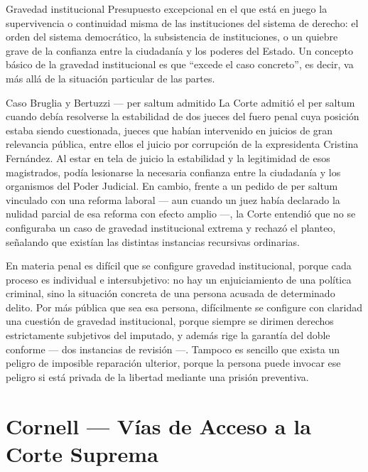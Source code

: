 \documentclass[12pt,oneside]{book}
\begin{document}
\begin{definition}{Gravedad institucional}
Presupuesto excepcional en el que está en juego la supervivencia o continuidad misma de las instituciones del sistema de derecho: el orden del sistema democrático, la subsistencia de instituciones, o un quiebre grave de la confianza entre la ciudadanía y los poderes del Estado. Un concepto básico de la gravedad institucional es que ``excede el caso concreto'', es decir, va más allá de la situación particular de las partes.
\end{definition}

\begin{example}{Caso Bruglia y Bertuzzi --- per saltum admitido}
La Corte admitió el per saltum cuando debía resolverse la estabilidad de dos jueces del fuero penal cuya posición estaba siendo cuestionada, jueces que habían intervenido en juicios de gran relevancia pública, entre ellos el juicio por corrupción de la expresidenta Cristina Fernández. Al estar en tela de juicio la estabilidad y la legitimidad de esos magistrados, podía lesionarse la necesaria confianza entre la ciudadanía y los organismos del Poder Judicial. En cambio, frente a un pedido de per saltum vinculado con una reforma laboral --- aun cuando un juez había declarado la nulidad parcial de esa reforma con efecto amplio ---, la Corte entendió que no se configuraba un caso de gravedad institucional extrema y rechazó el planteo, señalando que existían las distintas instancias recursivas ordinarias.
\end{example}

En materia penal es difícil que se configure gravedad institucional, porque cada proceso es individual e intersubjetivo: no hay un enjuiciamiento de una política criminal, sino la situación concreta de una persona acusada de determinado delito. Por más pública que sea esa persona, difícilmente se configure con claridad una cuestión de gravedad institucional, porque siempre se dirimen derechos estrictamente subjetivos del imputado, y además rige la garantía del doble conforme --- dos instancias de revisión ---. Tampoco es sencillo que exista un peligro de imposible reparación ulterior, porque la persona puede invocar ese peligro si está privada de la libertad mediante una prisión preventiva.

\section*{Cornell --- Vías de Acceso a la Corte Suprema}
\end{document}
